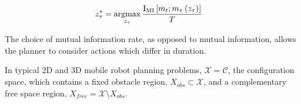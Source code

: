\documentclass{article}
\begin{document}
\begin{align} \begin{split}
  z_{\tau}^{*}
  &=
  \argmax_{z_{\tau}}
  \frac{\text{I}_{\text{MI}}\left[m_{t}; m_{\tau}\left(z_{\tau}\right) \right]}
  {T}
\end{split} \end{align}

The choice of mutual information rate, as opposed to mutual information, allows the planner to consider actions which differ in duration.

In typical 2D and 3D mobile robot planning problems, $\mathcal{X} = \mathcal{C}$, the configuration space, which contains a fixed obstacle region, $X_{obs} \subset \mathcal{X}$, and a complementary free space region, $X_{free} = \mathcal{X} \setminus X_{obs}$.
\fi
\end{document}

